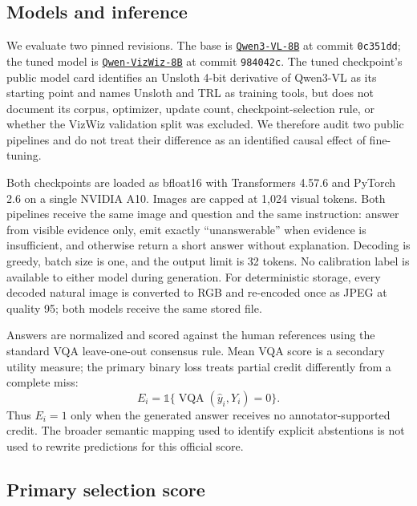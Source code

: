 \documentclass[11pt]{article}
\newcommand{\BaseCheckpoint}{\texttt{Qwen3-VL-8B}}
\newcommand{\TunedCheckpoint}{\texttt{Qwen-VizWiz-8B}}
\begin{document}
\subsection{Models and inference}

We evaluate two pinned revisions.  The base is
\href{https://huggingface.co/Qwen/Qwen3-VL-8B-Instruct}{\BaseCheckpoint{}}
at commit \texttt{0c351dd}; the tuned model is
\href{https://huggingface.co/praddzy/Qwen-VizWiz-8B}{\TunedCheckpoint{}}
at commit \texttt{984042c}.  The tuned
checkpoint's public model card identifies an Unsloth 4-bit derivative of Qwen3-VL
as its starting point and names Unsloth and TRL as training tools, but does not
document its corpus, optimizer, update count, checkpoint-selection rule, or whether
the VizWiz validation split was excluded.  We therefore audit two public pipelines
and do not treat their difference as an identified causal effect of fine-tuning.

Both checkpoints are loaded as bfloat16 with Transformers 4.57.6 and PyTorch 2.6
on a single NVIDIA A10.  Images are capped at 1,024 visual tokens.  Both pipelines
receive the same image and question and the same instruction: answer from visible evidence
only, emit exactly ``unanswerable'' when evidence is insufficient, and otherwise
return a short answer without explanation.  Decoding is greedy, batch size is one,
and the output limit is 32 tokens.  No calibration label is available to either
model during generation.  For deterministic storage, every decoded natural image
is converted to RGB and re-encoded once as JPEG at quality 95; both models receive
the same stored file.

Answers are normalized and scored against the human references using the standard
VQA leave-one-out consensus rule.  Mean VQA score is a secondary utility measure;
the primary binary loss treats partial credit differently from a complete miss:
\begin{equation}
  E_i = \mathbb{1}\{\operatorname{VQA}(\hat y_i,Y_i)=0\}.
  \label{eq:error}
\end{equation}
Thus $E_i=1$ only when the generated answer receives no annotator-supported credit.
The broader semantic mapping used to identify explicit abstentions is not used to
rewrite predictions for this official score.

\subsection{Primary selection score}
\end{document}
